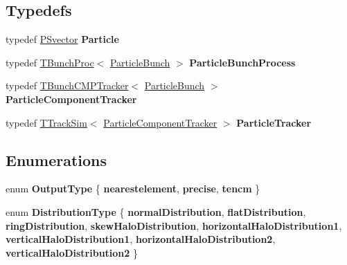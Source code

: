 \subsection*{Typedefs}
\begin{DoxyCompactItemize}
\item 
\mbox{\label{namespaceParticleTracking_a3a7c9a96834ae3119a5d14b0a00aadd0}} 
typedef \hyperlink{classPSvector}{P\+Svector} {\bfseries Particle}
\item 
\mbox{\label{namespaceParticleTracking_a0e74db4d6ec0e32540c578802a94bfd8}} 
typedef \hyperlink{classTBunchProc}{T\+Bunch\+Proc}$<$ \hyperlink{classParticleTracking_1_1ParticleBunch}{Particle\+Bunch} $>$ {\bfseries Particle\+Bunch\+Process}
\item 
\mbox{\label{namespaceParticleTracking_a395e29c596a0657a489d3955827a4209}} 
typedef \hyperlink{classTBunchCMPTracker}{T\+Bunch\+C\+M\+P\+Tracker}$<$ \hyperlink{classParticleTracking_1_1ParticleBunch}{Particle\+Bunch} $>$ {\bfseries Particle\+Component\+Tracker}
\item 
\mbox{\label{namespaceParticleTracking_a99f5a95ed532fafeab86c406acd23ef7}} 
typedef \hyperlink{classTTrackSim}{T\+Track\+Sim}$<$ \hyperlink{classTBunchCMPTracker}{Particle\+Component\+Tracker} $>$ {\bfseries Particle\+Tracker}
\end{DoxyCompactItemize}
\subsection*{Enumerations}
\begin{DoxyCompactItemize}
\item 
\mbox{\label{namespaceParticleTracking_aa4c228b3bb3a00456d02f88a6744438e}} 
enum {\bfseries Output\+Type} \{ {\bfseries nearestelement}, 
{\bfseries precise}, 
{\bfseries tencm}
 \}
\item 
\mbox{\label{namespaceParticleTracking_a1995473ab280be9e2832acb4b651bbaa}} 
enum {\bfseries Distribution\+Type} \{ \newline
{\bfseries normal\+Distribution}, 
{\bfseries flat\+Distribution}, 
{\bfseries ring\+Distribution}, 
{\bfseries skew\+Halo\+Distribution}, 
\newline
{\bfseries horizontal\+Halo\+Distribution1}, 
{\bfseries vertical\+Halo\+Distribution1}, 
{\bfseries horizontal\+Halo\+Distribution2}, 
{\bfseries vertical\+Halo\+Distribution2}
 \}
\end{DoxyCompactItemize}
